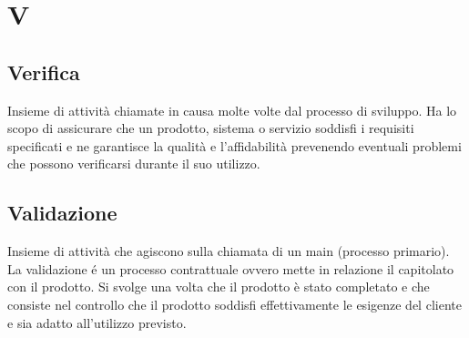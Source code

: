 \section{V}
\subsection{Verifica}%
Insieme di attività chiamate in causa molte volte dal processo di sviluppo.
Ha lo scopo di assicurare che un prodotto, sistema o servizio soddisfi i requisiti specificati e ne 
garantisce la qualità e l'affidabilità prevenendo eventuali problemi che possono verificarsi durante il suo utilizzo.
\subsection{Validazione}%
Insieme di attività che agiscono sulla chiamata di un main (processo primario).
La validazione é un processo contrattuale ovvero mette in relazione il capitolato con il prodotto.
Si svolge una volta che il prodotto è stato completato e che consiste nel
controllo che il prodotto soddisfi effettivamente le esigenze del cliente e sia adatto all'utilizzo previsto.
\clearpage